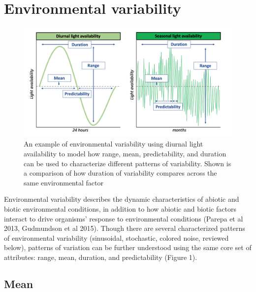 \documentclass[12pt,twoside]{reedthesis}
\begin{document}
\hypertarget{environmental-variability}{%
\section{Environmental variability}\label{environmental-variability}}
\begin{figure}
\includegraphics[width=1.05\linewidth]{figures/figure1} \caption{An example of environmental variability using diurnal light availability to model how range, mean, predictability, and duration can be used to characterize different patterns of variability. Shown is a comparison of how duration of variability compares across the same environmental factor}\label{fig:unnamed-chunk-3}
\end{figure}
Environmental variability describes the dynamic characteristics of abiotic and biotic environmental conditions, in addition to how abiotic and biotic factors interact to drive organisms' response to environmental conditions (Parepa et al 2013, Gudmundson et al 2015). Though there are several characterized patterns of environmental variability (sinusoidal, stochastic, colored noise, reviewed below), patterns of variation can be further understood using the same core set of attributes: range, mean, duration, and predictability (Figure 1).

\hypertarget{mean}{%
\subsection{Mean}\label{mean}}
\end{document}
